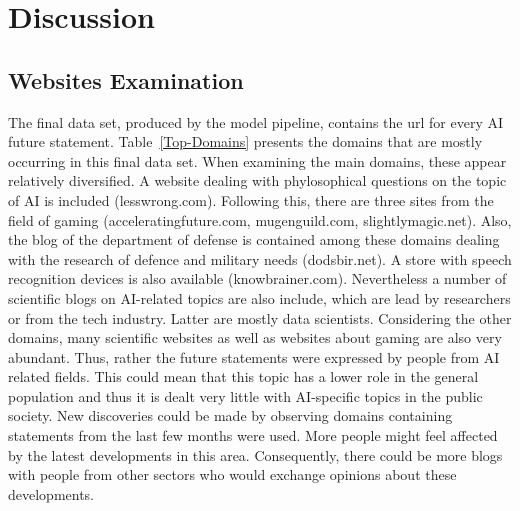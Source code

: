 \section{Discussion}

\subsection{Websites Examination}

The final data set, produced by the model pipeline, contains the url for every AI future statement.
Table~\ref{Top-Domains} presents the domains that are mostly occurring in this final data set.
When examining the main domains, these appear relatively  diversified.
A website dealing with phylosophical questions on the topic of AI is included (lesswrong.com). 
Following this, there are three sites from the field of gaming (acceleratingfuture.com, mugenguild.com, slightlymagic.net).
Also, the blog of the department of defense is contained among these domains dealing with the research of defence and military needs (dodsbir.net).
A store with speech recognition devices is also available (knowbrainer.com).
Nevertheless a number of scientific blogs on AI-related topics are also include, which are lead by researchers or from the tech industry.
Latter are mostly data scientists.
Considering the other domains, many scientific websites as well as websites about gaming are also very abundant.
Thus, rather the future statements were expressed by people from AI related fields.
This could mean that this topic has a lower role in the general population and thus it is dealt very little with AI-specific topics in the public society.
New discoveries could be made by observing domains containing statements from the last few months were used.
More people might feel affected by the latest developments in this area.
Consequently, there could be more blogs with people from other sectors who would exchange opinions about these developments.
